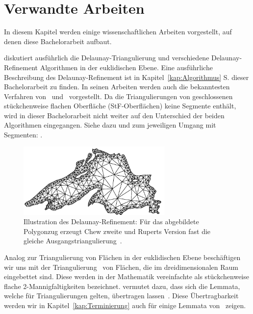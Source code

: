\chapter{ Verwandte Arbeiten}


In diesem Kapitel werden einige wissenschaftlichen Arbeiten vorgestellt,
auf denen diese Bachelorarbeit aufbaut.

\citeauthor{SHEWCHUK:2002:chuws}\cite{shewchuk:1997:delaunay,SHEWCHUK:2002:chuws} diskutiert ausführlich die Delaunay-Triangulierung und verschiedene Delaunay-Refinement Algorithmen in der euklidischen Ebene. Eine ausführliche Beschreibung des Delaunay-Refinement ist in Kapitel~\ref{kap:Algorithmus} S.\pageref{kap:Algorithmus} dieser Bachelorarbeit zu finden.
In seinen Arbeiten werden auch die bekanntesten Verfahren von~\citet{chew:1993:guaranteed,chew:1989:guaranteed} und~\citet{ruppert:1995:delaunay} vorgestellt.
Da die Triangulierungen von geschlossenen stückchenweise flachen Oberfläche (StF-Oberflächen) keine Segmente enthält, wird in dieser Bachelorarbeit nicht weiter auf den Unterschied der beiden Algorithmen eingegangen. Siehe dazu und zum jeweiligen Umgang mit Segmenten: \citeauthor{shewchuk:1997:delaunay}.\\
\begin{figure}[ht]%
    \centering
  \includegraphics[width=3in]{images/tripslg.png}
  \caption{Illustration des Delaunay-Refinement:
  Für das abgebildete Polygonzug erzeugt Chew zweite und Ruperts Version fast die gleiche Ausgangstriangulierung~\cite{SHEWCHUK:2002:chuws}.}
\end{figure} 

Analog zur Triangulierung von Flächen in der euklidischen Ebene beschäftigen wir uns mit der Triangulierung~\cite{Bobenko:2007:LaplaceBeltrami} von Flächen, die im dreidimensionalen Raum eingebettet sind. Diese werden in der Mathematik  vereinfachte als stückchenweise flache 2-Mannigfaltigkeiten  \cite{betke:1984:2-Mannigfaltigkeiten} bezeichnet.
\citeauthor{SHEWCHUK:2002:chuws} vermutet dazu, dass sich die Lemmata, welche für Triangulierungen gelten, übertragen lassen~\cite[Abschnitte 5.3.2]{SHEWCHUK:2002:chuws}. Diese Übertragbarkeit werden wir in Kapitel~\ref{kap:Terminierung}  auch für einige Lemmata von~\citet{ruppert:1995:delaunay} zeigen.\\  

